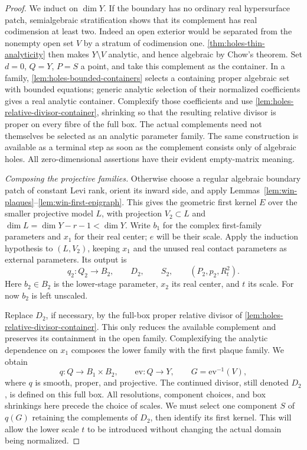 \begin{proof}
We induct on $\dim Y$.  If the boundary has no ordinary real hypersurface patch, semialgebraic stratification shows that its complement has real codimension at least two.  Indeed an open exterior would be separated from the nonempty open set $V$ by a stratum of codimension one.  \cref{thm:holes-thin-analyticity} then makes $Y\setminus V$ analytic, and hence algebraic by Chow's theorem.  Set $d=0$, $Q=Y$, $P=S$ a point, and take this complement as the container.  In a family, \cref{lem:holes-bounded-containers} selects a containing proper algebraic set with bounded equations; generic analytic selection of their normalized coefficients gives a real analytic container.  Complexify those coefficients and use \cref{lem:holes-relative-divisor-container}, shrinking so that the resulting relative divisor is proper on every fibre of the full box.  The actual complements need not themselves be selected as an analytic parameter family.  The same construction is available as a terminal step as soon as the complement consists only of algebraic holes. All zero-dimensional assertions have their evident empty-matrix meaning.

\emph{Composing the projective families.} Otherwise choose a regular algebraic boundary patch of constant Levi rank, orient its inward side, and apply Lemmas~\ref{lem:win-plaques}--\ref{lem:win-first-epigraph}.  This gives the geometric first kernel $E$ over the smaller projective model $L$, with projection $V_2\subset L$ and $\dim L=\dim Y-r-1<\dim Y$. Write $b_1$ for the complex first-family parameters and $x_1$ for their real center; $e$ will be their scale.  Apply the induction hypothesis to $(L,V_2)$, keeping $x_1$ and the unused real contact parameters as external parameters.  Its output is
\[
 q_2:Q_2\to B_2,\qquad D_2,\qquad S_2,\qquad
 (P_2,p_2,R_t^2).
\]
Here $b_2\in B_2$ is the lower-stage parameter, $x_2$ its real center, and $t$ its scale.  For now $b_2$ is left unscaled.

Replace $D_2$, if necessary, by the full-box proper relative divisor of \cref{lem:holes-relative-divisor-container}.  This only reduces the available complement and preserves its containment in the open family.  Complexifying the analytic dependence on $x_1$ composes the lower family with the first plaque family.  We obtain
\[
 q:Q\longrightarrow B_1\times B_2,
 \qquad \mathrm{ev}:Q\longrightarrow Y,
 \qquad G=\mathrm{ev}^{-1}(V),
\]
where $q$ is smooth, proper, and projective.  The continued divisor, still denoted $D_2$, is defined on this full box.  All resolutions, component choices, and box shrinkings here precede the choice of scales.  We must select one component $S$ of $q(G)$ retaining the complements of $D_2$, then identify its first kernel.  This will allow the lower scale $t$ to be introduced without changing the actual domain being normalized.


\end{proof}
